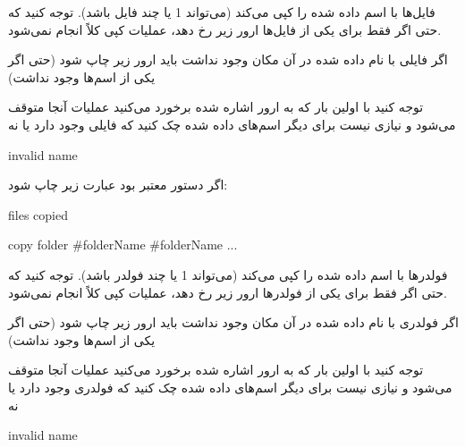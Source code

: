 \documentclass[]{article}
\begin{document}
فایل‌ها با اسم داده شده را کپی می‌کند (می‌تواند 1 یا چند فایل باشد). توجه کنید که حتی اگر فقط برای یکی از فایل‌ها ارور زیر رخ دهد، عملیات کپی کلاً انجام نمی‌شود.

اگر فایلی با نام داده شده در آن مکان وجود نداشت باید ارور زیر چاپ شود (حتی اگر یکی از اسم‌ها وجود نداشت)

توجه کنید با اولین بار که به ارور اشاره شده برخورد می‌کنید عملیات آنجا متوقف می‌شود و نیازی نیست برای دیگر اسم‌های داده شده چک کنید که فایلی وجود دارد یا نه

\begin{tcolorbox}[boxrule=0pt]
	\begin{latin}
  	  \large{
invalid name

		}
	\end{latin}
\end{tcolorbox}



اگر دستور معتبر بود عبارت زیر چاپ شود:

\begin{tcolorbox}[boxrule=0pt]
	\begin{latin}
  	  \large{
files copied

		}
	\end{latin}
\end{tcolorbox}



\begin{tcolorbox}[boxrule=0pt]
	\begin{latin}
  	  \large{
copy folder \#folderName \#folderName ...

		}
	\end{latin}
\end{tcolorbox}

فولدرها با اسم داده شده را کپی می‌کند (می‌تواند 1 یا چند فولدر باشد). توجه کنید که حتی اگر فقط برای یکی از فولدرها ارور زیر رخ دهد، عملیات کپی کلاً انجام نمی‌شود.

اگر فولدری با نام داده شده در آن مکان وجود نداشت باید ارور زیر چاپ شود (حتی اگر یکی از اسم‌ها وجود نداشت)

توجه کنید با اولین بار که به ارور اشاره شده برخورد می‌کنید عملیات آنجا متوقف می‌شود و نیازی نیست برای دیگر اسم‌های داده شده چک کنید که فولدری وجود دارد یا نه

\begin{tcolorbox}[boxrule=0pt]
	\begin{latin}
  	  \large{
invalid name

		}
	\end{latin}
\end{tcolorbox}
\end{document}
